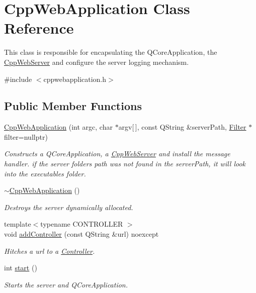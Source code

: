 \hypertarget{class_cpp_web_application}{}\section{Cpp\+Web\+Application Class Reference}
\label{class_cpp_web_application}


This class is responsible for encapsulating the Q\+Core\+Application, the \hyperlink{class_cpp_web_server}{Cpp\+Web\+Server} and configure the server logging mechanism.  




{\ttfamily \#include $<$cppwebapplication.\+h$>$}

\subsection*{Public Member Functions}
\begin{DoxyCompactItemize}
\item 
\hyperlink{class_cpp_web_application_a76766ee1be8080db9db6df98e1b9e907}{Cpp\+Web\+Application} (int argc, char $\ast$argv\mbox{[}$\,$\mbox{]}, const Q\+String \&server\+Path, \hyperlink{class_filter}{Filter} $\ast$filter=nullptr)
\begin{DoxyCompactList}\small\item\em Constructs a Q\+Core\+Application, a \hyperlink{class_cpp_web_server}{Cpp\+Web\+Server} and install the message handler. if the server folder\textquotesingle{}s path was not found in the server\+Path, it will look into the executable\textquotesingle{}s folder. \end{DoxyCompactList}\item 
\mbox{\label{class_cpp_web_application_a96a7655a25d2e35ed545cdb7b8d81cc5}} 
\hyperlink{class_cpp_web_application_a96a7655a25d2e35ed545cdb7b8d81cc5}{$\sim$\+Cpp\+Web\+Application} ()
\begin{DoxyCompactList}\small\item\em Destroys the server dynamically allocated. \end{DoxyCompactList}\item 
{\footnotesize template$<$typename C\+O\+N\+T\+R\+O\+L\+L\+ER $>$ }\\void \hyperlink{class_cpp_web_application_ab4f105dee5ddd0cb7c6c93917057e850}{add\+Controller} (const Q\+String \&url) noexcept
\begin{DoxyCompactList}\small\item\em Hitches a url to a \hyperlink{class_controller}{Controller}. \end{DoxyCompactList}\item 
int \hyperlink{class_cpp_web_application_a1e9f2c789934748d6b7c29ad33e9d7c9}{start} ()
\begin{DoxyCompactList}\small\item\em Starts the server and Q\+Core\+Application. \end{DoxyCompactList}\end{DoxyCompactItemize}



